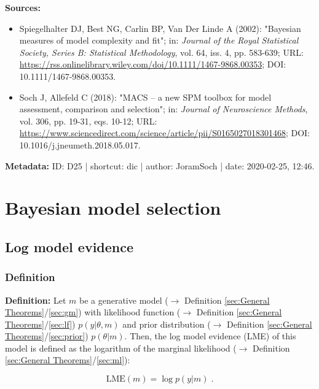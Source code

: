 \documentclass[a4paper,12pt]{book}
\begin{document}
\vspace{1em}
\textbf{Sources:}
\begin{itemize}
\item Spiegelhalter DJ, Best NG, Carlin BP, Van Der Linde A (2002): "Bayesian measures of model complexity and fit"; in: \textit{Journal of the Royal Statistical Society, Series B: Statistical Methodology}, vol. 64, iss. 4, pp. 583-639; URL: \url{https://rss.onlinelibrary.wiley.com/doi/10.1111/1467-9868.00353}; DOI: 10.1111/1467-9868.00353.
\item Soch J, Allefeld C (2018): "MACS – a new SPM toolbox for model assessment, comparison and selection"; in: \textit{Journal of Neuroscience Methods}, vol. 306, pp. 19-31, eqs. 10-12; URL: \url{https://www.sciencedirect.com/science/article/pii/S0165027018301468}; DOI: 10.1016/j.jneumeth.2018.05.017.
\end{itemize}


\vspace{1em}
\textbf{Metadata:} ID: D25 | shortcut: dic | author: JoramSoch | date: 2020-02-25, 12:46.


\pagebreak
\section{Bayesian model selection}

\subsection{Log model evidence}

\subsubsection[\textit{Definition}]{Definition} \label{sec:lme}

\vspace{1em}
\textbf{Definition:} Let $m$ be a generative model ($\rightarrow$ Definition \ref{sec:General Theorems}/\ref{sec:gm}) with likelihood function ($\rightarrow$ Definition \ref{sec:General Theorems}/\ref{sec:lf}) $p(y \vert \theta, m)$ and prior distribution ($\rightarrow$ Definition \ref{sec:General Theorems}/\ref{sec:prior}) $p(\theta \vert m)$. Then, the log model evidence (LME) of this model is defined as the logarithm of the marginal likelihood ($\rightarrow$ Definition \ref{sec:General Theorems}/\ref{sec:ml}):

\begin{equation} \label{eq:lme-LME}
\mathrm{LME}(m) = \log p(y|m) \; .
\end{equation}
\end{document}
